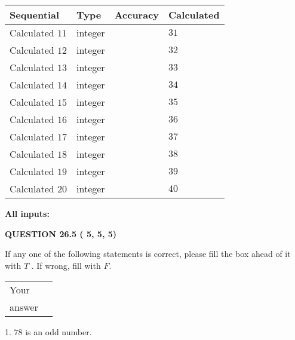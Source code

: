 \documentclass[12pt]{article}
\begin{document}
   
  
  
\noindent\begin{tabular}{|l|l|l|l|}
\hline
 Sequential & Type & Accuracy & Calculated \\ 
\hline
 
 
  Calculated $          11$ & integer &  & 
  $ 31 $ 
 \\  \hline  
 
 
  Calculated $          12$ & integer &  & 
  $ 32 $ 
 \\  \hline  
 
 
  Calculated $          13$ & integer &  & 
  $ 33 $ 
 \\  \hline  
 
 
  Calculated $          14$ & integer &  & 
  $ 34 $ 
 \\  \hline  
 
 
  Calculated $          15$ & integer &  & 
  $ 35 $ 
 \\  \hline  
 
 
  Calculated $          16$ & integer &  & 
  $ 36 $ 
 \\  \hline  
 
 
  Calculated $          17$ & integer &  & 
  $ 37 $ 
 \\  \hline  
 
 
  Calculated $          18$ & integer &  & 
  $ 38 $ 
 \\  \hline  
 
 
  Calculated $          19$ & integer &  & 
  $ 39 $ 
 \\  \hline  
 
 
  Calculated $          20$ & integer &  & 
  $ 40 $ 
 \\  \hline  
 \end{tabular}
   
   
   
   
\noindent\vspace{0.1in}\hspace{-0.08in} {\textbf{\Large{All inputs: }}}
   
   
  
\vspace{0.2in}
  
{\textbf{\Large{QUESTION
26.5 
 (          5,          5,          5)
}}}
  
  
If any one of the following statements is correct, please fill the box ahead of it with $T$ .
If wrong, fill with $F$.
 
\noindent\begin{tabular}{|l|l|}\hline Your&\hspace{.2in} \\ answer&\hspace{.2in} \\ \hline \end{tabular}
1. $ %
78$ is an  %
odd number.
 
\end{document}
